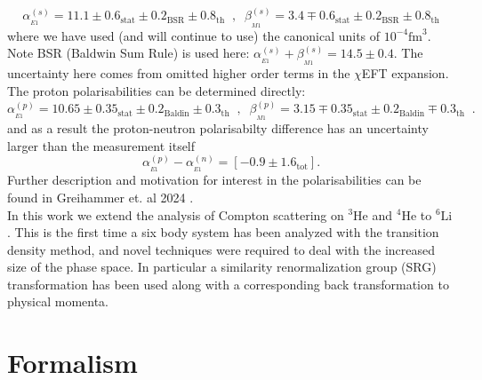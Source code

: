 \documentclass[12pt]{article}
\newcommand{\cEFT}{$\chi$EFT}
\newcommand{\sixLi}{{}^{6} \mathrm{Li} }
\newcommand{\HeF}{{}^{4} \mathrm{He}}
\newcommand{\HeT}{{}^{3} \mathrm{He}}
\newcommand{\al}{\alpha_{_{E1}}}
\newcommand{\be}{\beta_{_{M1}}}
\newcommand{\3}{\ss}
\numberwithin{equation}{section}
\begin{document}
\begin{equation}
  \label{eq:alphabeta}
  \al^{(s)}=11.1\pm0.6_\mathrm{stat}\pm0.2_\mathrm{BSR}\pm0.8_\mathrm{th}
  \;\;,\;\;
  \be^{(s)}=3.4\mp0.6_\mathrm{stat}\pm0.2_\mathrm{BSR}\pm0.8_\mathrm{th}
\end{equation}
where we have used (and will continue to use) the canonical units of
$10^{-4} \mathrm{fm}^3$.
Note BSR (Baldwin Sum Rule) is used here: $\al^{(s)}+\be^{(s)}=14.5\pm0.4$.
The uncertainty here comes from omitted higher order terms in the
\cEFT\; expansion.
The proton polarisabilities can be determined directly:\\
\begin{equation}
  \label{eq:protonpols}
  \al^{(p)}=10.65\pm0.35_{\text{stat}}\pm0.2_\text{Baldin}\pm0.3_\text{th}
  \;\;,\;\;
  \be^{(p)} = 3.15\mp0.35_\text{stat}\pm0.2_\text{Baldin}\mp0.3_\text{th}\;\;.
\end{equation}
and as a result the proton-neutron polarisabilty difference has an
uncertainty larger than the measurement itself\\
\begin{equation}
  \al^{(p)} - \al^{(n)}= \left[ -0.9 \pm 1.6_{\text{tot}} \right].
\end{equation}
Further description and motivation for interest in the
polarisabilities can be found in Grei\textbeta hammer et. al 2024
\cite{hgrie4He}.\\

In this work we extend the analysis of Compton scattering on $\HeT$
and $\HeF$ to $\sixLi$ \cite{hgrie4He, hgrie3He}.
This is the first time a six body system has been analyzed with the
transition density method, and novel techniques were required to deal
with the increased size of the phase space.
In particular a similarity renormalization group (SRG) transformation
has been used along with a corresponding back transformation to
physical momenta.
\section{Formalism}
\end{document}
